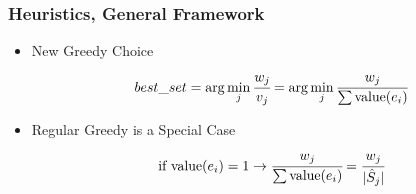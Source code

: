 \documentclass{beamer}
\begin{document}
\begin{frame}
\frametitle{Heuristics, General Framework}
\begin{minipage}{0.30\textwidth}
\begin{overlayarea}{\textwidth}{0.5\textheight}
% 
\end{overlayarea}%
\end{minipage}%
\begin{minipage}{0.70\textwidth} 
\begin{itemize}
\item<1-> New Greedy Choice 
$$ best\_set = \arg \min_{j} \cfrac{w_j}{v_j} = \arg \min_{j} \cfrac{w_j}{\sum \text{value}(e_i)} $$
\item<2> Regular Greedy is a Special Case
 $$ \text{if value}(e_i) = 1 \rightarrow \cfrac{w_j}{\sum\text{value}(e_i)} = \cfrac{w_j}{|\hat{S}_j|}$$
\end{itemize}
\end{minipage}
\end{frame}
\end{document}

